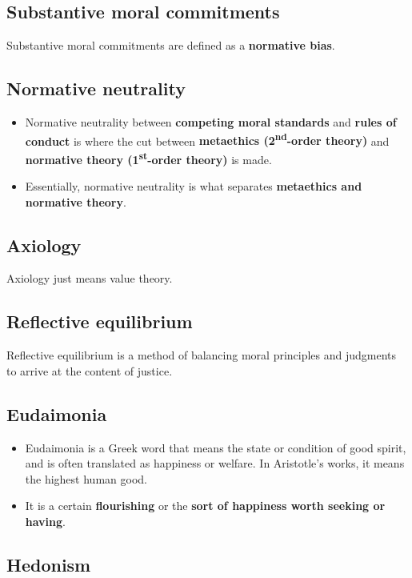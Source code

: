 \documentclass[11pt]{article}
\begin{document}
\subsection{Substantive moral commitments}
\label{sec:org5aea2e5}
Substantive moral commitments are defined as a \textbf{normative bias}.
\subsection{Normative neutrality}
\label{sec:org61974b5}
\begin{itemize}
\item Normative neutrality between \textbf{competing moral standards} and \textbf{rules of conduct} is where the cut between \textbf{metaethics (2\textsuperscript{nd}-order theory)} and \textbf{normative theory (1\textsuperscript{st}-order theory)} is made.
\item Essentially, normative neutrality is what separates \textbf{metaethics and normative theory}.
\end{itemize}
\subsection{Axiology}
\label{sec:org3bb0b1c}
Axiology just means value theory.
\subsection{Reflective equilibrium}
\label{sec:org183cc7b}
Reflective equilibrium is a method of balancing moral principles and judgments to arrive at the content of justice.

 \newpage
\subsection{Eudaimonia}
\label{sec:org7945d41}
\begin{itemize}
\item Eudaimonia is a Greek word that means the state or condition of good spirit, and is often translated as happiness or welfare. In Aristotle's works, it means the highest human good.
\item It is a certain \textbf{flourishing} or the \textbf{sort of happiness worth seeking or having}.
\end{itemize}
\subsection{Hedonism}
\label{sec:org6133a37}
\end{document}

